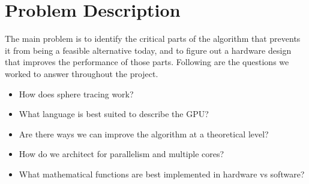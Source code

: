 \chapter{Problem Description}

	The main problem is to identify the critical parts of the algorithm that
	prevents it from being a feasible alternative today, and to figure out a
	 hardware design that improves the performance of those parts. Following are the
	questions we worked to answer throughout the project.
	
	\begin{itemize}
		\item How does sphere tracing work?
		\item What language is best suited to describe the GPU?
		\item Are there ways we can improve the algorithm at a theoretical 
			level?
		\item How do we architect for parallelism and multiple cores?
		\item What mathematical functions are best implemented in hardware vs 
			software?
	\end{itemize}
